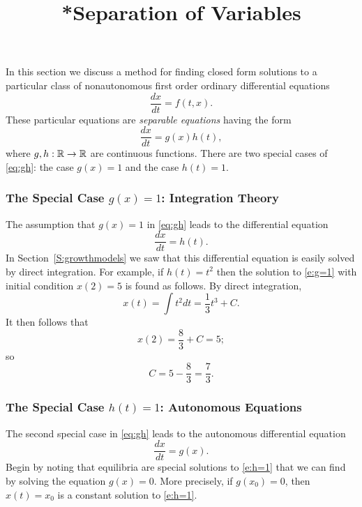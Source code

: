\documentclass{ximera}
\title{*Separation of Variables}
\begin{document}
\begin{abstract}
\end{abstract}
\maketitle


\label{sec:sov} 

In this section we discuss a method for finding closed form solutions to
a particular class of nonautonomous first order ordinary differential 
equations 
\begin{equation}  \label{e:nonauto}
\frac{dx}{dt} = f(t,x).
\end{equation}
These particular equations are {\em separable equations\/} having the form 
\begin{equation}  \label{eq:gh}
\frac{dx}{dt} = g(x) h(t),
\end{equation}
where $g,h:\mbox{$\Bbb{R}$}\to\mbox{$\Bbb{R}$}$ are continuous functions.   There are two special cases 
of \eqref{eq:gh}: the case $g(x)=1$ and the case $h(t)=1$.  

\subsubsection*{The Special Case $g(x)=1$: Integration Theory}

The assumption that $g(x)=1$ in \eqref{eq:gh} leads to the differential 
equation 
\begin{equation}  \label{e:g=1}
\frac{dx}{dt} = h(t).
\end{equation}
In Section~\ref{S:growthmodels} we saw that this differential equation  
is easily solved by direct integration.  For example, if $h(t)=t^2$ then 
the solution to \eqref{e:g=1} with initial condition $x(2)=5$ is found as
follows.  By direct integration,
\[
x(t) = \int t^2 dt = \frac{1}{3}t^3 + C.
\]
It then follows that
\[
x(2) = \frac{8}{3} + C = 5;
\]
so 
\[
C = 5 - \frac{8}{3} = \frac{7}{3}.
\]


\subsubsection*{The Special Case $h(t)=1$: Autonomous Equations}

The second special case in \eqref{eq:gh} leads to the autonomous 
differential equation
\begin{equation}  \label{e:h=1}
\frac{dx}{dt} = g(x).
\end{equation}
Begin by noting that equilibria are special solutions to \eqref{e:h=1} that we 
can find by solving the equation $g(x)=0$.  More precisely, if $g(x_0)=0$, 
then $x(t)=x_0$ is a constant solution to \eqref{e:h=1}.  
\end{document}
